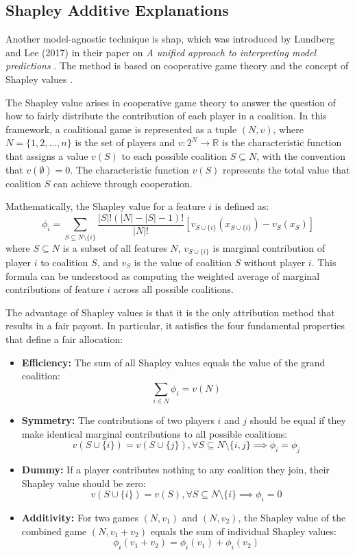 \subsection{Shapley Additive Explanations} \label{sec:shap}

Another model-agnostic technique is \acrfull{shap}, which was introduced by Lundberg and Lee (2017) in their paper on \textit{A unified approach to interpreting model predictions} \cite{Lundberg2017}. The method is based on cooperative game theory and the concept of Shapley values \cite{Shapley1953}.

The Shapley value arises in cooperative game theory to answer the question of how to fairly distribute the contribution of each player in a coalition. In this framework, a coalitional game is represented as a tuple $(N,v)$, where $N = \{1, 2, \ldots, n\}$ is the set of players and $v: 2^N \rightarrow \mathbb{R}$ is the characteristic function that assigns a value $v(S)$ to each possible coalition $S \subseteq N$, with the convention that $v(\emptyset) = 0$. The characteristic function $v(S)$ represents the total value that coalition $S$ can achieve through cooperation. 

Mathematically, the Shapley value for a feature $i$ is defined as:
\begin{equation}
    \phi_i = \sum_{S \subseteq N \setminus \{i\}} \frac{|S|! (|N| - |S| - 1)!}{|N|!} \left[ v_{S \cup \{i\}}(x_{S \cup \{i\}}) - v_S(x_S) \right]
\end{equation}
where $S \subseteq N$ is a subset of all features $N$, $v_{S \cup \{i\}}$ is marginal contribution of player $i$ to coalition $S$, and $v_S$ is the value of coalition $S$ without player $i$. This formula can be understood as computing the weighted average of marginal contributions of feature $i$ across all possible coalitions. 

The advantage of Shapley values is that it is the only attribution method that results in a fair payout. In particular, it satisfies the four fundamental properties that define a fair allocation: 

\begin{itemize}
    \item \textbf{Efficiency:} The sum of all Shapley values equals the value of the grand coalition:
    \[
        \sum_{i \in N} \phi_i = v(N)
    \]
    \item \textbf{Symmetry:} The contributions of two players $i$ and $j$ should be equal if they make identical marginal contributions to all possible coalitions:
    \[
        v(S \cup \{i\}) = v(S \cup \{j\}), \forall S \subseteq N \setminus \{i, j\} \implies \phi_i = \phi_j
    \]
    \item \textbf{Dummy:} If a player contributes nothing to any coalition they join, their Shapley value should be zero:
    \[
        v(S \cup \{i\}) = v(S), \forall S \subseteq N \setminus \{i\} \implies \phi_i = 0
    \]
    \item \textbf{Additivity:} For two games $(N,v_1)$ and $(N,v_2)$, the Shapley value of the combined game $(N,v_1+v_2)$ equals the sum of individual Shapley values:
    \[
        \phi_i(v_1 + v_2) = \phi_i(v_1) + \phi_i(v_2)
    \]
\end{itemize}

